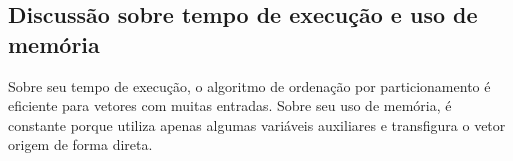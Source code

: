 \subsection{Discussão sobre tempo de execução e uso de memória}

Sobre seu tempo de execução, o algoritmo de ordenação por particionamento é eficiente para
vetores com muitas entradas. Sobre seu uso de memória, é constante porque utiliza apenas algumas variáveis
auxiliares e transfigura o vetor origem de forma direta.

